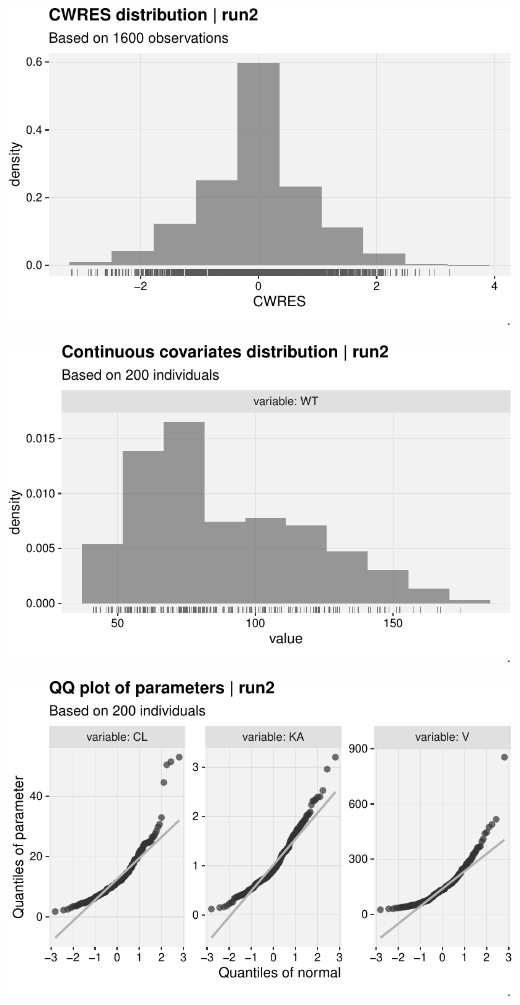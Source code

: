 \documentclass[
  letterpaper,
  toc=chapterentrywithdots,
  11pt,
  headings=small]{scrreprt}
\begin{document}
\includegraphics{sec/results_files/figure-pdf/unnamed-chunk-4-14.pdf}

\includegraphics{sec/results_files/figure-pdf/unnamed-chunk-4-15.pdf}

\includegraphics{sec/results_files/figure-pdf/unnamed-chunk-4-16.pdf}
\end{document}
